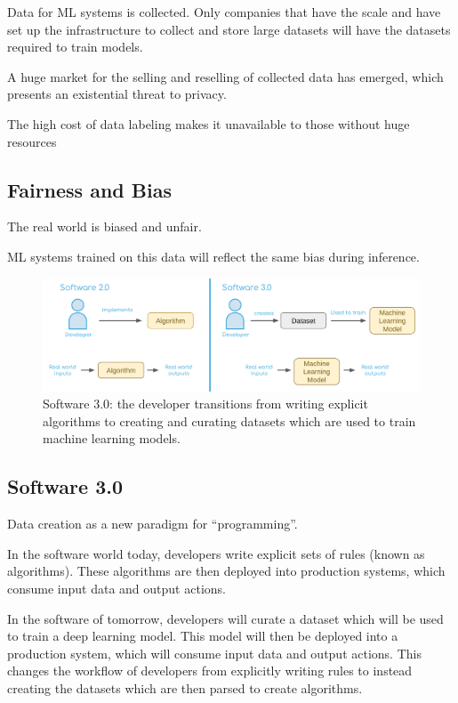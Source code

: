 \documentclass{article}
\begin{document}
Data for ML systems is collected. Only companies that have the scale and have set up the infrastructure to collect and store large datasets will have the datasets required to train models.

A huge market for the selling and reselling of collected data has emerged, which presents an existential threat to privacy.

The high cost of data labeling makes it unavailable to those without huge resources

\subsection{Fairness and Bias}

The real world is biased and unfair.

ML systems trained on this data will reflect the same bias during inference.

\begin{figure}
	\centering
	\includegraphics[width=\textwidth]{software3.png}
	\caption{Software 3.0: the developer transitions from writing explicit algorithms to creating and curating datasets which are used to train machine learning models.}
	\label{fig:fig2}
\end{figure}

\subsection{Software 3.0}
\label{sec:software3.0}

Data creation as a new paradigm for “programming”.

In the software world today, developers write explicit sets of rules (known as algorithms). These algorithms are then deployed into production systems, which consume input data and output actions.

In the software of tomorrow, developers will curate a dataset which will be used to train a deep learning model. This model will then be deployed into a production system, which will consume input data and output actions. This changes the workflow of developers from explicitly writing rules to instead creating the datasets which are then parsed to create algorithms.
\end{document}
